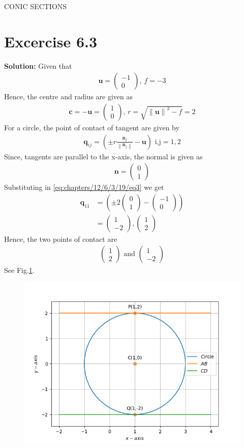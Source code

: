 \documentclass[12pt]{article}
\providecommand{\brak}[1]{\ensuremath{\left(#1\right)}}
\providecommand{\norm}[1]{\left\lVert#1\right\rVert}
\newcommand{\solution}{\noindent \textbf{Solution: }}
\newcommand{\myvec}[1]{\ensuremath{\begin{pmatrix}#1\end{pmatrix}}}
\let\vec\mathbf
\begin{document}
\begin{center}
\textbf\large{CONIC SECTIONS}

\end{center}
\section*{Excercise 6.3}

\solution
\fi
Given that 
\begin{align}
	\vec{u} = \myvec{-1\\0},\,
	f = -3
\end{align}
Hence, the centre and radius are given as
\begin{align}
	\vec{c} = -\vec{u} = \myvec{1\\0},\,
	r = \sqrt{\norm{\vec{u}}^2 - f}
	  = 2
\end{align}
For a circle, the point of contact of tangent are given by
\begin{align}
	\label{eq:chapters/12/6/3/19/eq3}
	\vec{q}_{ij} = \brak{\pm r\frac{\vec{n}_j}{\norm{\vec{n}_j}}-\vec{u}} \text{ i,j} = 1,2
\end{align}
Since, tangents are parallel to the x-axis, the normal is given as
\begin{align}
	\vec{n} = \myvec{0\\1}
\end{align}
Substituting in \eqref{eq:chapters/12/6/3/19/eq3} we get
\begin{align}
	\vec{q}_{11} &= \brak{\pm 2\myvec{0\\1} - \myvec{-1\\0}}\\
	&= \myvec{1\\-2},\myvec{1\\2}
\end{align}
Hence, the two points of contact are
\begin{align}
	\myvec{1\\2} \text{ and } \myvec{1\\-2}
\end{align}
See Fig.\ref{fig:chapters/12/6/3/19/Fig1}.
\begin{figure}[!h]
	\begin{center} 
	    \includegraphics[width=\columnwidth]{chapters/12/6/3/19/figs/tan1}
	\end{center}
\caption{}
\label{fig:chapters/12/6/3/19/Fig1}
\end{figure}
\end{document}
